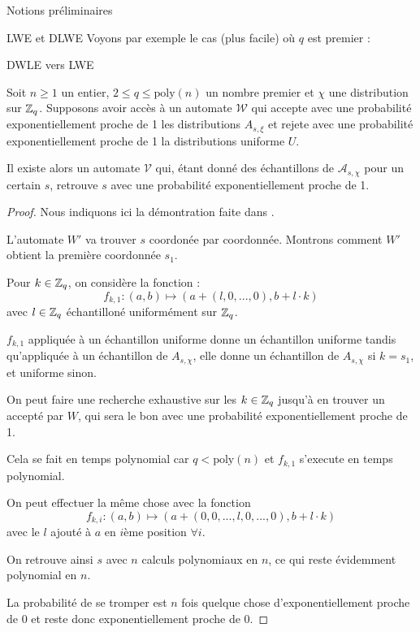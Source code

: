\begin{section}{Notions préliminaires}
\begin{subsection}{LWE et DLWE}
	Voyons par exemple le cas (plus facile) où $q$ est premier :

	\begin{prop}{DWLE vers LWE}

	Soit $n \geqslant 1$ un entier, $2 \leqslant q \leqslant \text{poly}(n)$ un nombre premier et $\chi$ une distribution sur $\mathbb{Z}_q$. Supposons avoir accès à un automate $\mathcal{W}$ qui accepte avec une probabilité exponentiellement proche de 1 les distributions $A_{s, \xi}$ et rejete avec une probabilité exponentiellement proche de 1 la distributions uniforme $U$.
	
	Il existe alors un automate $\mathcal{V}$ qui, étant donné des échantillons de $\mathcal{A}_{s,\chi}$ pour un certain $s$, retrouve $s$ avec une probabilité exponentiellement proche de 1.
	\end{prop}
	\begin{proof}
	Nous indiquons ici la démontration faite dans \cite{STOC:Regev05}.
	
	L'automate $W'$ va trouver $s$ coordonée par coordonnée. Montrons comment $W'$ obtient la première coordonnée $s_1$.
	
	Pour $k \in \mathbb{Z}_q$, on considère la fonction :
	\[f_{k,1}: (a,b) \mapsto (a + (l, 0, ..., 0), b + l \cdot k) \]
	avec $l\in \mathbb{Z}_q$ échantilloné uniformément sur $\mathbb{Z}_q$.
	
	$f_{k,1}$ appliquée à un échantillon uniforme donne un échantillon uniforme tandis qu'appliquée à un échantillon de $A_{s, \chi}$, elle donne un échantillon de $A_{s, \chi}$ si $k = s_1$, et uniforme sinon.
	
	On peut faire une recherche exhaustive sur les $k \in \mathbb{Z}_q$ jusqu'à en trouver un accepté par $W$, qui sera le bon avec une probabilité exponentiellement proche de 1.
	
	Cela se fait en temps polynomial car $q < \text{poly}(n)$ et $f_{k,1}$ s'execute en temps polynomial.
	
	On peut effectuer la même chose avec la fonction
	\[f_{k,i}: (a,b) \mapsto (a + (0, 0, ..., l, 0, ..., 0), b + l \cdot k) \]
	avec le $l$ ajouté à $a$ en $i$ème position $\forall i$.
	
	On retrouve ainsi $s$ avec $n$ calculs polynomiaux en $n$, ce qui reste évidemment polynomial en $n$.
	
	La probabilité de se tromper est $n$ fois quelque chose d'exponentiellement proche de 0 et reste donc exponentiellement proche de 0.
	\end{proof}


\end{subsection}
\end{section}
